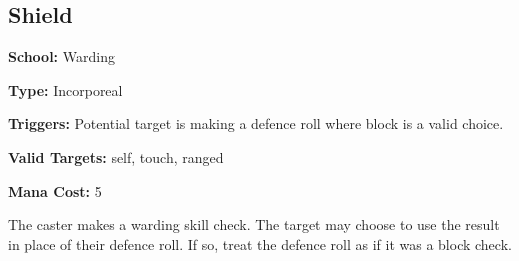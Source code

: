 \subsection{Shield}

\noindent
\textbf{School:} Warding

\noindent
\textbf{Type:} Incorporeal

\noindent
\textbf{Triggers:} Potential target is making a defence roll where block is a
valid choice.

\noindent
\textbf{Valid Targets:} self, touch, ranged

\noindent
\textbf{Mana Cost:} 5

The caster makes a warding skill check. The target may choose to use the result
in place of their defence roll. If so, treat the defence roll as if it was a
block check.
